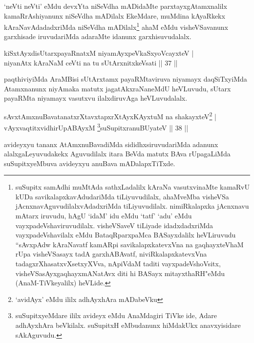 \begin{artha}
`neVti neVti' eMdu devxYta niSeVdha mADidaMte parxtayxgAtamxnalilx kamaRrAshiyanunx niSeVdha mADilalx EkeMdare, muMdina kAyaRkekx kAraNavAdadadxriMda niSeVdha mADilalx\footnote{suSupitx samAdhi muMtAda sathxLadalilx kAraNa vasutxvinaMte kamaRvU kUDa savikalapxkavAdudariMda tiLiyuvudilalx, ahaMveMba visheVSa jAcnxnavAguvudilalxvAdadxriMda tiLiyuvudilalx. nimiRkalapxka jAcnxnavu mAtarx iruvudu, hAgU `idaM' idu eMdu `tatf' `adu' eMdu vayxpadeVshaviruvudilalx. visheVSaveV tiLiyade idadxdadxriMda vayxpadeVshavilalx eMdu BataqRparxpaMca BASayxdalilx heVLiruvudu ``sAvxpAdw kAraNavatf kamARpi savikalapxkatevxVna na gaqhayxteV\s haM rUpa visheVSasayx tadA garxhABAvatf, niviRkalapxkatevxVna tadagxrXhasatxvXsetxyXVva, nApiVdaM taditi vayxpadeVshoV\s sitx, visheVSasAyx\s gaqhayxmANatAvx diti hi BASayx mitayxthaRH"eMdu (AnaM-TiVkeyalilx) heVLide.} ahaM eMdu visheVSavanunx garxhisade iruvudariMda adaraMte idanunx garxhisuvudalalx.
\end{artha}

\begin{shl}
kiSxtAyxdisUtarxpayaRnatxM niyamAyxpeVkaSxyoVcayxteV |\\
niyanAtx kAraNaM ceVti na tu sUtArxnitxkeV\s sati \hfill || 37 ||
\end{shl}

\begin{artha}%
paqthiviyiMda AraMBisi sUtArxtamx payaRMtaviruva niyamayx daqSiTxyiMda Atamxnanunx niyAmaka matutx jagatAkxraNaneMdU heVLuvudu, sUtarx payaRMta niyamayx vasutxvu ilalxdiruvAga heVLuvudalalx.
\end{artha}


\begin{shl}
sAvxtAmxnuBavatanatxrXtavxtapxrXtAyxKAyxtuM na shakayxteV\footnote{`avidAyx' eMdu ililx adhAyxhAra mADabeVku} |\\
vAyxvaqtitxvidhirUpABAyxM \footnote{suSupitxyeMdare ililx avideyx eMdu AnaMdagiri TiVke ide, Adare adhAyxhAra beVkilalx. suSupitxH eMbudanunx hiMdakUkx anavxyisidare sAkAguvudu.}suSupitxranuBUyateV \hfill || 38 ||
\end{shl}

\begin{artha}
avideyxyu tananx AtAmxnuBavadiMda sididhxsiruvudariMda adanunx alalxgaLeyuvudakekx Aguvudilalx itara BeVda matutx BAva rUpagaLiMda suSupitxyeMbuva avideyxyu anuBava mADalapxTiTxde.
\end{artha}

